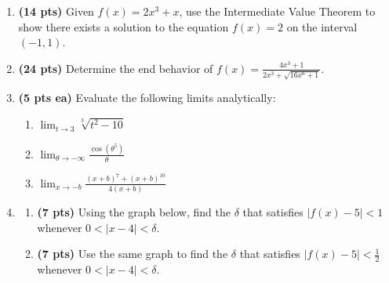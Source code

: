 \documentclass[12pt]{article}
\begin{document}
\begin{enumerate}

\newpage
\item {\bf (14 pts)} Given $f(x)=2x^3+x$, use the Intermediate Value Theorem to show there exists
a solution to the equation $f(x)=2$ on the interval $(-1,1)$. 
\vspace{22pc}

\item {\bf (24 pts)} Determine the end behavior of $f(x)=\frac{4x^3+1}{2x^3+\sqrt{16x^6+1}}$.
	\vspace{22pc}

\newpage
\item {\bf (5 pts ea)} Evaluate the following limits analytically:
\begin{enumerate}
	\item $\lim_{t\to 3}\sqrt[3]{t^2-10}$
	\vspace{14pc}
	\item$\lim_{\theta\to -\infty}\frac{\cos{(\theta^5)}}{\theta}$
	\vspace{14pc}
		
	\item $\lim_{x\to -b}\frac{(x+b)^7+(x+b)^{10}}{4(x+b)}$
	\vspace{14pc}
\end{enumerate}

\newpage
\item \begin{enumerate}\vspace{-2pc}
	\item {\bf (7 pts)} Using the graph below, find the $\delta$ that satisfies $|f(x)-5|<1$ whenever $0<|x-4|<\delta$.
	\vspace{4pc}
	
	\item {\bf (7 pts)} Use the same graph to find the $\delta$ that satisfies $|f(x)-5|<\textstyle\frac{1}{2}$ whenever $0<|x-4|<\delta$.
	\vspace{4pc}
	

\end{enumerate}
\end{enumerate}
\end{document}

